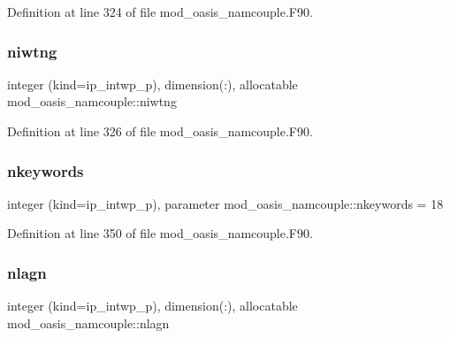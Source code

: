 Definition at line 324 of file mod\+\_\+oasis\+\_\+namcouple.\+F90.

\mbox{\label{namespacemod__oasis__namcouple_a3379333e7d0f24b776c81b1087f3a3b4}} 
\subsubsection{\texorpdfstring{niwtng}{niwtng}}
{\footnotesize\ttfamily integer (kind=ip\+\_\+intwp\+\_\+p), dimension(\+:), allocatable mod\+\_\+oasis\+\_\+namcouple\+::niwtng\hspace{0.3cm}{\ttfamily [private]}}



Definition at line 326 of file mod\+\_\+oasis\+\_\+namcouple.\+F90.

\mbox{\label{namespacemod__oasis__namcouple_ab629bd69885e9cd058f694b00474333a}} 
\subsubsection{\texorpdfstring{nkeywords}{nkeywords}}
{\footnotesize\ttfamily integer (kind=ip\+\_\+intwp\+\_\+p), parameter mod\+\_\+oasis\+\_\+namcouple\+::nkeywords = 18\hspace{0.3cm}{\ttfamily [private]}}



Definition at line 350 of file mod\+\_\+oasis\+\_\+namcouple.\+F90.

\mbox{\label{namespacemod__oasis__namcouple_aad06af35c92de78d71671d39bcbb1690}} 
\subsubsection{\texorpdfstring{nlagn}{nlagn}}
{\footnotesize\ttfamily integer (kind=ip\+\_\+intwp\+\_\+p), dimension(\+:), allocatable mod\+\_\+oasis\+\_\+namcouple\+::nlagn\hspace{0.3cm}{\ttfamily [private]}}



